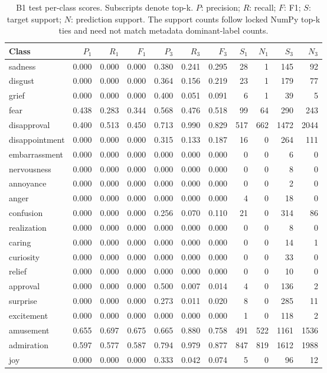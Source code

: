 \begin{table}[!htbp]
\centering
\scriptsize
\setlength{\tabcolsep}{5pt}
\begin{tabular}{lrrrrrrrrrr}
\toprule
Class & $P_1$ & $R_1$ & $F_1$ & $P_3$ & $R_3$ & $F_3$ & $S_1$ & $N_1$ & $S_3$ & $N_3$ \\
\midrule
sadness & 0.000 & 0.000 & 0.000 & 0.380 & 0.241 & 0.295 & 28 & 1 & 145 & 92 \\
disgust & 0.000 & 0.000 & 0.000 & 0.364 & 0.156 & 0.219 & 23 & 1 & 179 & 77 \\
grief & 0.000 & 0.000 & 0.000 & 0.400 & 0.051 & 0.091 & 6 & 1 & 39 & 5 \\
fear & 0.438 & 0.283 & 0.344 & 0.568 & 0.476 & 0.518 & 99 & 64 & 290 & 243 \\
disapproval & 0.400 & 0.513 & 0.450 & 0.713 & 0.990 & 0.829 & 517 & 662 & 1472 & 2044 \\
disappointment & 0.000 & 0.000 & 0.000 & 0.315 & 0.133 & 0.187 & 16 & 0 & 264 & 111 \\
embarrassment & 0.000 & 0.000 & 0.000 & 0.000 & 0.000 & 0.000 & 0 & 0 & 6 & 0 \\
nervousness & 0.000 & 0.000 & 0.000 & 0.000 & 0.000 & 0.000 & 0 & 0 & 8 & 0 \\
annoyance & 0.000 & 0.000 & 0.000 & 0.000 & 0.000 & 0.000 & 0 & 0 & 2 & 0 \\
anger & 0.000 & 0.000 & 0.000 & 0.000 & 0.000 & 0.000 & 4 & 0 & 18 & 0 \\
confusion & 0.000 & 0.000 & 0.000 & 0.256 & 0.070 & 0.110 & 21 & 0 & 314 & 86 \\
realization & 0.000 & 0.000 & 0.000 & 0.000 & 0.000 & 0.000 & 0 & 0 & 8 & 0 \\
caring & 0.000 & 0.000 & 0.000 & 0.000 & 0.000 & 0.000 & 0 & 0 & 14 & 1 \\
curiosity & 0.000 & 0.000 & 0.000 & 0.000 & 0.000 & 0.000 & 0 & 0 & 33 & 0 \\
relief & 0.000 & 0.000 & 0.000 & 0.000 & 0.000 & 0.000 & 0 & 0 & 10 & 0 \\
approval & 0.000 & 0.000 & 0.000 & 0.500 & 0.007 & 0.014 & 4 & 0 & 136 & 2 \\
surprise & 0.000 & 0.000 & 0.000 & 0.273 & 0.011 & 0.020 & 8 & 0 & 285 & 11 \\
excitement & 0.000 & 0.000 & 0.000 & 0.000 & 0.000 & 0.000 & 1 & 0 & 118 & 2 \\
amusement & 0.655 & 0.697 & 0.675 & 0.665 & 0.880 & 0.758 & 491 & 522 & 1161 & 1536 \\
admiration & 0.597 & 0.577 & 0.587 & 0.794 & 0.979 & 0.877 & 847 & 819 & 1612 & 1988 \\
joy & 0.000 & 0.000 & 0.000 & 0.333 & 0.042 & 0.074 & 5 & 0 & 96 & 12 \\
\bottomrule
\end{tabular}
\caption{B1 test per-class scores. Subscripts denote top-k. $P$: precision; $R$: recall; $F$: F1; $S$: target support; $N$: prediction support. The support counts follow locked NumPy top-k ties and need not match metadata dominant-label counts.}
\label{tab:classes-b1_meanpool}
\end{table}
